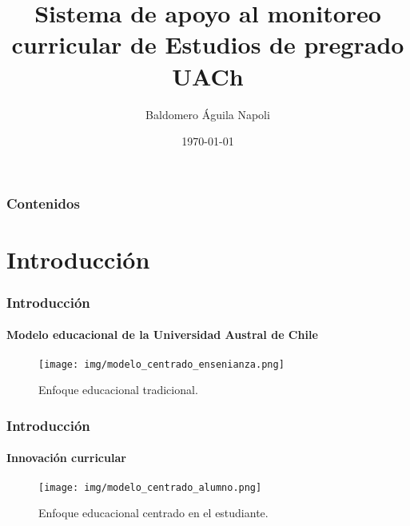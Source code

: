 \documentclass{beamer}
\title[Proyecto de Tesis]{Sistema de apoyo al monitoreo curricular de Estudios de pregrado UACh} %
\author{Baldomero Águila Napoli} %
\institute[UACh] %
{
Universidad Austral de Chile \\ %
\medskip
\textit{Patrocinante: Mauricio Ruiz-Tagle} %
}
\date{\today} %
\begin{document}
\begin{frame}
\titlepage %
\end{frame}

\begin{frame}
\frametitle{Contenidos} %
\tableofcontents[pausesections] %
\end{frame}


\section{Introducción} %

\begin{frame}
\frametitle{Introducción}
\framesubtitle{Modelo  educacional de la Universidad Austral de Chile}
\begin{figure}
\texttt{[image: img/modelo\_centrado\_ensenianza.png]}
\caption{Enfoque educacional tradicional.}
\end{figure}
\end{frame}


\begin{frame}
\frametitle{Introducción}
\framesubtitle{Innovación curricular}
\begin{figure}
\texttt{[image: img/modelo\_centrado\_alumno.png]}
\caption{Enfoque educacional centrado en el estudiante.}
\end{figure}
\end{frame}
\end{document}
